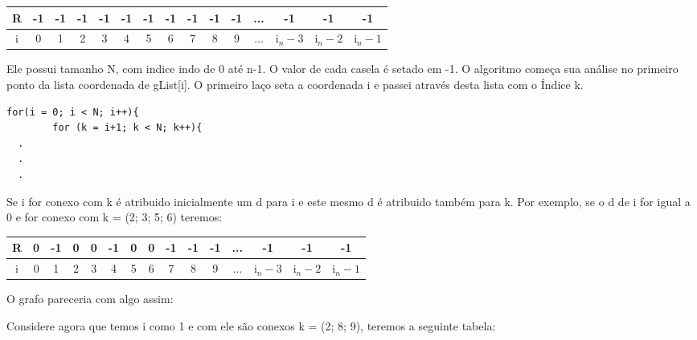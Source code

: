 \documentclass[a4paper,11pt]{article}
\begin{document}
\begin{table}[ht]
\centering
\begin{tabular}{c |c | c |c |c |c |c |c |c |c |c |c |c |c |c }
R & -1 & -1 & -1 & -1 & -1 & -1 & -1 & -1 & -1 & -1 & ... & -1 & -1 & -1 \\ \hline \hline
i & 0 & 1 & 2 & 3 & 4 & 5 & 6 & 7 & 8 & 9 & ... & i$_n-3$ & i$_n-2$ & i$_n-1$ 
\end{tabular}
\end{table}

Ele possui tamanho N, com indice indo de 0 até n-1. O valor de cada casela é setado em -1. O algoritmo começa sua análise no primeiro ponto da lista coordenada de gList[i]. O primeiro laço seta a coordenada i e passei através desta lista com o Índice k.

\begin{lstlisting}[frame=single]
  for(i = 0; i < N; i++){
        for (k = i+1; k < N; k++){
  .
  .
  .
\end{lstlisting}

Se i for conexo com k é atribuido inicialmente um d para i e este mesmo d é atribuido também para k. Por exemplo, se o d de  i for igual a 0 e for conexo com k = (2; 3; 5; 6) teremos:

\begin{table}[ht]
\centering
\begin{tabular}{c |c | c |c |c |c |c |c |c |c |c |c |c |c |c }
R & 0 & -1 & 0 & 0 & -1 & 0 & 0 & -1 & -1 & -1 & ... & -1 & -1 & -1 \\ \hline \hline
i & 0 & 1 & 2 & 3 & 4 & 5 & 6 & 7 & 8 & 9 & ... & i$_n-3$ & i$_n-2$ & i$_n-1$ 
\end{tabular}
\end{table}

O grafo pareceria com algo assim: \\
\begin{center}
\end{center}

Considere agora que temos i como 1 e com ele são conexos k = (2; 8; 9), teremos a seguinte tabela:
\end{document}
